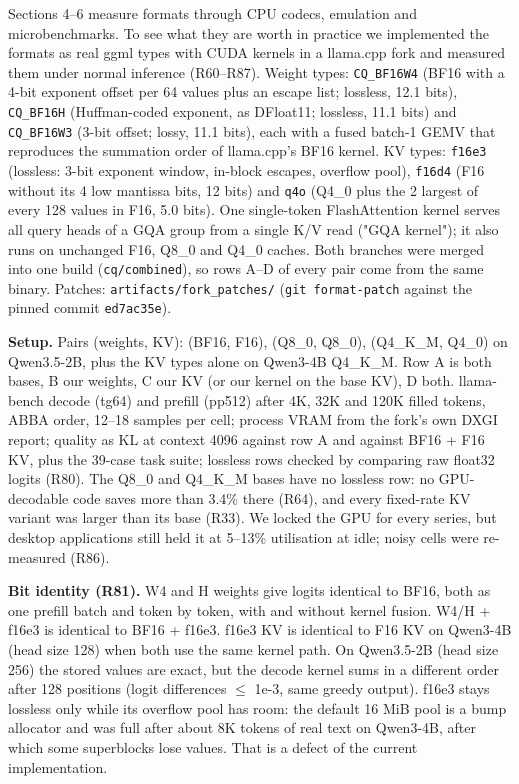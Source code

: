 \documentclass[10pt]{article}
\begin{document}
Sections 4--6 measure formats through CPU codecs, emulation and microbenchmarks. To see what they are worth in
practice we implemented the formats as real ggml types with CUDA kernels in a llama.cpp fork and measured them
under normal inference (R60--R87). Weight types: \texttt{CQ\_BF16W4} (BF16 with a 4-bit exponent offset per 64 values
plus an escape list; lossless, 12.1 bits), \texttt{CQ\_BF16H} (Huffman-coded exponent, as DFloat11; lossless, 11.1
bits) and \texttt{CQ\_BF16W3} (3-bit offset; lossy, 11.1 bits), each with a fused batch-1 GEMV that reproduces the
summation order of llama.cpp's BF16 kernel. KV types: \texttt{f16e3} (lossless: 3-bit exponent window, in-block
escapes, overflow pool), \texttt{f16d4} (F16 without its 4 low mantissa bits, 12 bits) and \texttt{q4o} (Q4\_0 plus the 2
largest of every 128 values in F16, 5.0 bits). One single-token FlashAttention kernel serves all query heads of
a GQA group from a single K/V read ("GQA kernel"); it also runs on unchanged F16, Q8\_0 and Q4\_0 caches. Both
branches were merged into one build (\texttt{cq/combined}), so rows A--D of every pair come from the same binary.
Patches: \texttt{artifacts/fork\_patches/} (\texttt{git format-patch} against the pinned commit \texttt{ed7ac35e}).

\textbf{Setup.} Pairs (weights, KV): (BF16, F16), (Q8\_0, Q8\_0), (Q4\_K\_M, Q4\_0) on Qwen3.5-2B, plus the KV types
alone on Qwen3-4B Q4\_K\_M. Row A is both bases, B our weights, C our KV (or our kernel on the base KV), D both.
llama-bench decode (tg64) and prefill (pp512) after 4K, 32K and 120K filled tokens, ABBA order, 12--18 samples
per cell; process VRAM from the fork's own DXGI report; quality as KL at context 4096 against row A and against
BF16 + F16 KV, plus the 39-case task suite; lossless rows checked by comparing raw float32 logits (R80). The
Q8\_0 and Q4\_K\_M bases have no lossless row: no GPU-decodable code saves more than 3.4\% there (R64), and every
fixed-rate KV variant was larger than its base (R33). We locked the GPU for every series, but desktop
applications still held it at 5--13\% utilisation at idle; noisy cells were re-measured (R86).

\textbf{Bit identity (R81).} W4 and H weights give logits identical to BF16, both as one prefill batch and token by
token, with and without kernel fusion. W4/H + f16e3 is identical to BF16 + f16e3. f16e3 KV is identical to F16
KV on Qwen3-4B (head size 128) when both use the same kernel path. On Qwen3.5-2B (head size 256) the stored
values are exact, but the decode kernel sums in a different order after 128 positions (logit differences
$\leq$ 1e-3, same greedy output). f16e3 stays lossless only while its overflow pool has room: the default 16 MiB
pool is a bump allocator and was full after about 8K tokens of real text on Qwen3-4B, after which some
superblocks lose values. That is a defect of the current implementation.
\end{document}
